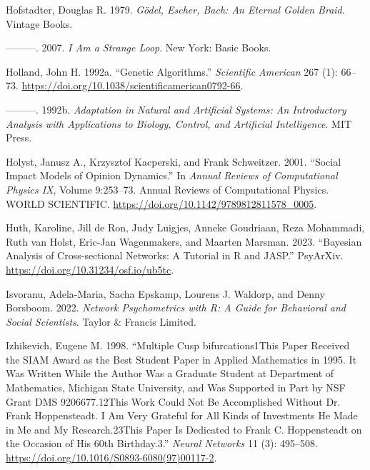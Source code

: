\documentclass[
  a4paper,
  DIV=11,
  numbers=noendperiod,
  oneside]{scrreprt}
\newlength{\cslhangindent}
\newenvironment{CSLReferences}[2] %
 {\begin{list}{}{%
  \setlength{\itemindent}{0pt}
  \setlength{\leftmargin}{0pt}
  \setlength{\parsep}{0pt}
  \ifodd #1
   \setlength{\leftmargin}{\cslhangindent}
   \setlength{\itemindent}{-1\cslhangindent}
  \fi
  \setlength{\itemsep}{#2\baselineskip}}}
 {\end{list}}
\begin{document}
\begin{CSLReferences}{1}{0}
Hofstadter, Douglas R. 1979. \emph{Gödel, {Escher}, {Bach}: {An Eternal
Golden Braid}}. {Vintage Books}.

---------. 2007. \emph{I Am a Strange Loop}. New York: Basic Books.

Holland, John H. 1992a. {``Genetic {Algorithms}.''} \emph{Scientific
American} 267 (1): 66--73.
\url{https://doi.org/10.1038/scientificamerican0792-66}.

---------. 1992b. \emph{Adaptation in {Natural} and {Artificial
Systems}: {An Introductory Analysis} with {Applications} to {Biology},
{Control}, and {Artificial Intelligence}}. {MIT Press}.

Holyst, Janusz A., Krzysztof Kacperski, and Frank Schweitzer. 2001.
{``Social Impact Models of Opinion Dynamics.''} In \emph{Annual
{Reviews} of {Computational Physics IX}}, Volume 9:253--73. Annual
{Reviews} of {Computational Physics}. {WORLD SCIENTIFIC}.
\url{https://doi.org/10.1142/9789812811578_0005}.

Huth, Karoline, Jill de Ron, Judy Luigjes, Anneke Goudriaan, Reza
Mohammadi, Ruth van Holst, Eric-Jan Wagenmakers, and Maarten Marsman.
2023. {``Bayesian {Analysis} of {Cross-sectional Networks}: {A Tutorial}
in {R} and {JASP}.''} {PsyArXiv}.
\url{https://doi.org/10.31234/osf.io/ub5tc}.

Isvoranu, Adela-Maria, Sacha Epskamp, Lourens J. Waldorp, and Denny
Borsboom. 2022. \emph{Network {Psychometrics} with {R}: {A Guide} for
{Behavioral} and {Social Scientists}}. {Taylor \& Francis Limited}.

Izhikevich, Eugene M. 1998. {``Multiple Cusp {bifurcations1This} Paper
Received the {SIAM Award} as the Best Student Paper in Applied
Mathematics in 1995. {It} Was Written While the Author Was a Graduate
Student at Department of {Mathematics}, {Michigan State University}, and
Was Supported in Part by {NSF} Grant {DMS} 9206677.{12This} Work Could
Not Be Accomplished Without {Dr}. {Frank Hoppensteadt}. {I} Am Very
Grateful for All Kinds of Investments He Made in Me and My
Research.{23This} Paper Is Dedicated to {Frank C}. {Hoppensteadt} on the
Occasion of His 60th Birthday.3.''} \emph{Neural Networks} 11 (3):
495--508. \url{https://doi.org/10.1016/S0893-6080(97)00117-2}.


\end{CSLReferences}
\end{document}
